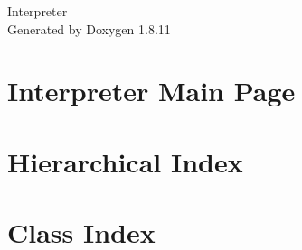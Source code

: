 \documentclass[twoside]{book}
\newcommand{\+}{\discretionary{\mbox{\scriptsize$\hookleftarrow$}}{}{}}
\newcommand{\clearemptydoublepage}{%
  \newpage{\pagestyle{empty}\cleardoublepage}%
}
\begin{document}
\hypersetup{pageanchor=false,
             bookmarksnumbered=true,
             pdfencoding=unicode
            }
\begin{titlepage}
\vspace*{7cm}
\begin{center}%
{\Large Interpreter }\\
\vspace*{1cm}
{\large Generated by Doxygen 1.8.11}\\
\end{center}
\end{titlepage}
\clearemptydoublepage
\tableofcontents
\clearemptydoublepage
{}
\hypersetup{pageanchor=true}

\chapter{Interpreter Main Page}
\label{index}\hypertarget{index}{}
\chapter{Hierarchical Index}

\chapter{Class Index}

\end{document}
